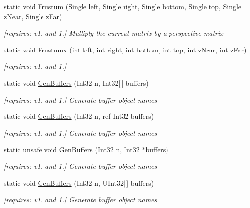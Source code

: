 \begin{DoxyCompactItemize}
static void \hyperlink{class_open_t_k_1_1_graphics_1_1_e_s11_1_1_g_l_aad5889341eb0fa0f8cf66c662ed9a260}{Frustum} (Single left, Single right, Single bottom, Single top, Single z\-Near, Single z\-Far)
\begin{DoxyCompactList}\small\item\em \mbox{[}requires\-: v1. and 1.\mbox{]} Multiply the current matrix by a perspective matrix \end{DoxyCompactList}\item 
static void \hyperlink{class_open_t_k_1_1_graphics_1_1_e_s11_1_1_g_l_a0decfe6c9e76049b7b6b845ac650971d}{Frustumx} (int left, int right, int bottom, int top, int z\-Near, int z\-Far)
\begin{DoxyCompactList}\small\item\em \mbox{[}requires\-: v1. and 1.\mbox{]}\end{DoxyCompactList}\item 
static void \hyperlink{class_open_t_k_1_1_graphics_1_1_e_s11_1_1_g_l_a0509577969b4eb35ff1e30199fa14365}{Gen\-Buffers} (Int32 n, Int32\mbox{[}$\,$\mbox{]} buffers)
\begin{DoxyCompactList}\small\item\em \mbox{[}requires\-: v1. and 1.\mbox{]} Generate buffer object names \end{DoxyCompactList}\item 
static void \hyperlink{class_open_t_k_1_1_graphics_1_1_e_s11_1_1_g_l_a196586f1ce814e11f893f7d25fc84cfe}{Gen\-Buffers} (Int32 n, ref Int32 buffers)
\begin{DoxyCompactList}\small\item\em \mbox{[}requires\-: v1. and 1.\mbox{]} Generate buffer object names \end{DoxyCompactList}\item 
static unsafe void \hyperlink{class_open_t_k_1_1_graphics_1_1_e_s11_1_1_g_l_a301f962be186aa06bed5fbcc98766d1c}{Gen\-Buffers} (Int32 n, Int32 $\ast$buffers)
\begin{DoxyCompactList}\small\item\em \mbox{[}requires\-: v1. and 1.\mbox{]} Generate buffer object names \end{DoxyCompactList}\item 
static void \hyperlink{class_open_t_k_1_1_graphics_1_1_e_s11_1_1_g_l_addb34e10210192505f3d26e20d342a22}{Gen\-Buffers} (Int32 n, U\-Int32\mbox{[}$\,$\mbox{]} buffers)
\begin{DoxyCompactList}\small\item\em \mbox{[}requires\-: v1. and 1.\mbox{]} Generate buffer object names \end{DoxyCompactList}\item 

\end{DoxyCompactItemize}
